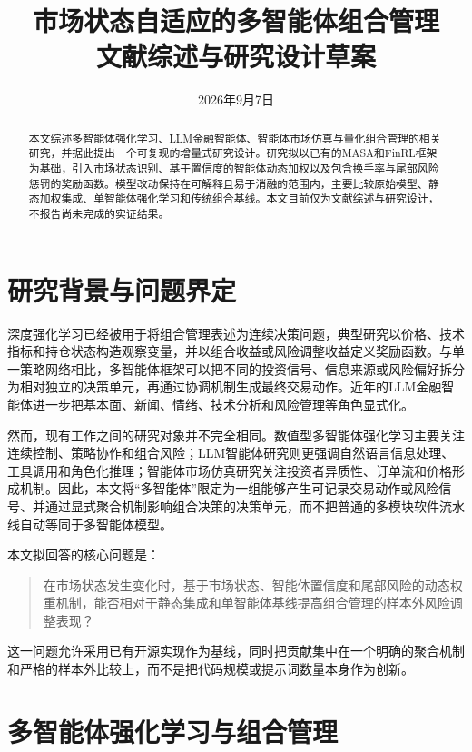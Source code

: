 \documentclass[10.5pt]{article}
\title{市场状态自适应的多智能体组合管理\\
\large 文献综述与研究设计草案}
\author{}
\date{2026年9月7日}
\begin{document}
\maketitle

\begin{abstract}
本文综述多智能体强化学习、LLM金融智能体、智能体市场仿真与量化组合管理的相关研究，并据此提出一个可复现的增量式研究设计。研究拟以已有的MASA和FinRL框架为基础，引入市场状态识别、基于置信度的智能体动态加权以及包含换手率与尾部风险惩罚的奖励函数。模型改动保持在可解释且易于消融的范围内，主要比较原始模型、静态加权集成、单智能体强化学习和传统组合基线。本文目前仅为文献综述与研究设计，不报告尚未完成的实证结果。
\end{abstract}

\section{研究背景与问题界定}

深度强化学习已经被用于将组合管理表述为连续决策问题，典型研究以价格、技术指标和持仓状态构造观察变量，并以组合收益或风险调整收益定义奖励函数\citep{JiangXuLiang2017,LiuYangChen2020}。与单一策略网络相比，多智能体框架可以把不同的投资信号、信息来源或风险偏好拆分为相对独立的决策单元，再通过协调机制生成最终交易动作。近年的LLM金融智能体进一步把基本面、新闻、情绪、技术分析和风险管理等角色显式化\citep{YuLiChen2023,XiaoSunLuo2024,YuYaoLi2024}。

然而，现有工作之间的研究对象并不完全相同。数值型多智能体强化学习主要关注连续控制、策略协作和组合风险；LLM智能体研究则更强调自然语言信息处理、工具调用和角色化推理；智能体市场仿真研究关注投资者异质性、订单流和价格形成机制\citep{ByrdHybinetteBalch2019,LopezLira2025,LiLiuLiu2024,YangZhangWu2025}。因此，本文将“多智能体”限定为一组能够产生可记录交易动作或风险信号、并通过显式聚合机制影响组合决策的决策单元，而不把普通的多模块软件流水线自动等同于多智能体模型。

本文拟回答的核心问题是：
\begin{quote}
在市场状态发生变化时，基于市场状态、智能体置信度和尾部风险的动态权重机制，能否相对于静态集成和单智能体基线提高组合管理的样本外风险调整表现？
\end{quote}

这一问题允许采用已有开源实现作为基线，同时把贡献集中在一个明确的聚合机制和严格的样本外比较上，而不是把代码规模或提示词数量本身作为创新。

\section{多智能体强化学习与组合管理}
\end{document}
